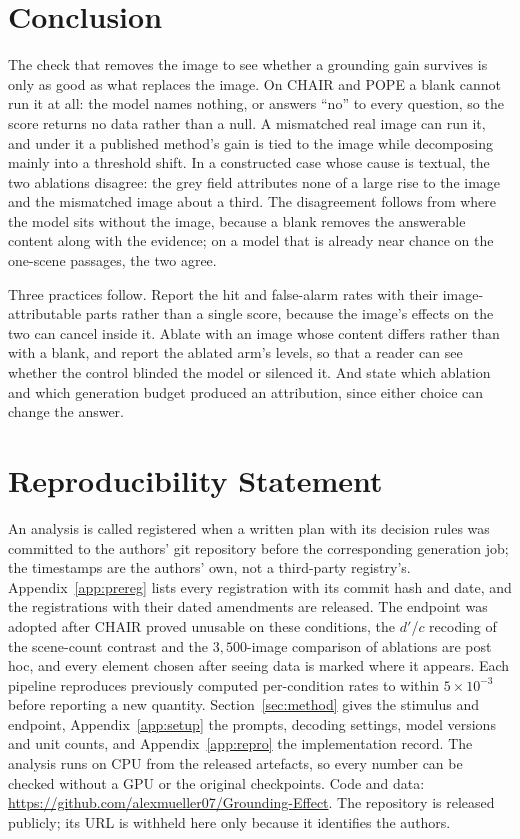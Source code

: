 \documentclass{article} %
\begin{document}
\section{Conclusion}
\label{sec:conclusion}

The check that removes the image to see whether a grounding gain survives is only as good as what
replaces the image. On CHAIR and POPE a blank cannot run it at all: the model names nothing, or answers
``no'' to every question, so the score returns no data rather than a null. A mismatched real image can
run it, and under it a published method's gain is tied to the image while decomposing mainly into a
threshold shift. In a constructed case whose cause is textual, the two ablations disagree: the grey
field attributes none of a large rise to the image and the mismatched image about a third. The
disagreement follows from where the model sits without the image, because a blank removes the
answerable content along with the evidence; on a model that is already near chance on the one-scene
passages, the two agree.

Three practices follow. Report the hit and false-alarm rates with their image-attributable parts rather
than a single score, because the image's effects on the two can cancel inside it. Ablate with an image
whose content differs rather than with a blank, and report the ablated arm's levels, so that a reader
can see whether the control blinded the model or silenced it. And state which ablation and which
generation budget produced an attribution, since either choice can change the answer.

\section*{Reproducibility Statement}

An analysis is called registered when a written plan with its decision rules was committed to the
authors' git repository before the corresponding generation job; the timestamps are the authors' own,
not a third-party registry's. Appendix~\ref{app:prereg} lists every registration with its commit hash
and date, and the registrations with their dated amendments are released. The endpoint was adopted
after CHAIR proved unusable on these conditions, the $d'$/$c$ recoding of the scene-count contrast and
the $3{,}500$-image comparison of ablations are post hoc, and every element chosen after seeing data is
marked where it appears. Each pipeline reproduces previously computed per-condition rates to within
$5\times10^{-3}$ before reporting a new quantity. Section~\ref{sec:method} gives the stimulus and
endpoint, Appendix~\ref{app:setup} the prompts, decoding settings, model versions and unit counts, and
Appendix~\ref{app:repro} the implementation record. The analysis runs on CPU from the released
artefacts, so every number can be checked without a GPU or the original checkpoints.
\ificlrfinal
  Code and data: \url{https://github.com/alexmueller07/Grounding-Effect}.
\else
  The repository is released publicly; its URL is withheld here only because it identifies
  the authors.
\fi
\end{document}

